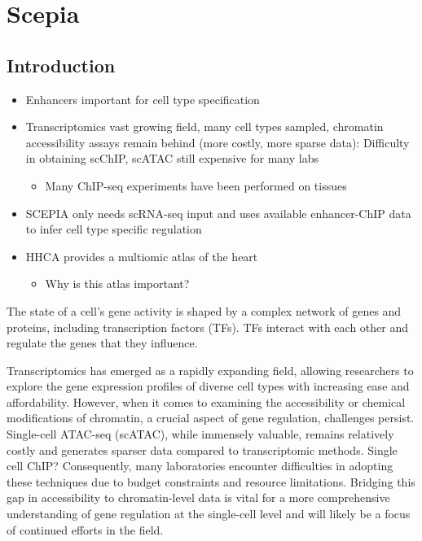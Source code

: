 \chapter{Scepia}\thumbforchapter
{}
\newpage

\section{Introduction}

\begin{itemize}
    \item Enhancers important for cell type specification
    \item Transcriptomics vast growing field, many cell types sampled, chromatin accessibility assays remain behind (more costly, more sparse data): Difficulty in obtaining scChIP, scATAC still expensive for many labs
    \begin{itemize}
        \item  Many ChIP-seq experiments have been performed on tissues
    \end{itemize}
    \item SCEPIA only needs scRNA-seq input and uses available enhancer-ChIP data to infer cell type specific regulation
    \item HHCA provides a multiomic atlas of the heart
    \begin{itemize}
        \item Why is this atlas important?
    \end{itemize}
\end{itemize}

The state of a cell's gene activity is shaped by a complex network of genes and proteins, including transcription factors (TFs). TFs interact with each other and regulate the genes that they influence.

Transcriptomics has emerged as a rapidly expanding field, allowing researchers to explore the gene expression profiles of diverse cell types with increasing ease and affordability. However, when it comes to examining the accessibility or chemical modifications of chromatin, a crucial aspect of gene regulation, challenges persist. Single-cell ATAC-seq (scATAC), while immensely valuable, remains relatively costly and generates sparser data compared to transcriptomic methods. Single cell ChIP? Consequently, many laboratories encounter difficulties in adopting these techniques due to budget constraints and resource limitations. Bridging this gap in accessibility to chromatin-level data is vital for a more comprehensive understanding of gene regulation at the single-cell level and will likely be a focus of continued efforts in the field.


